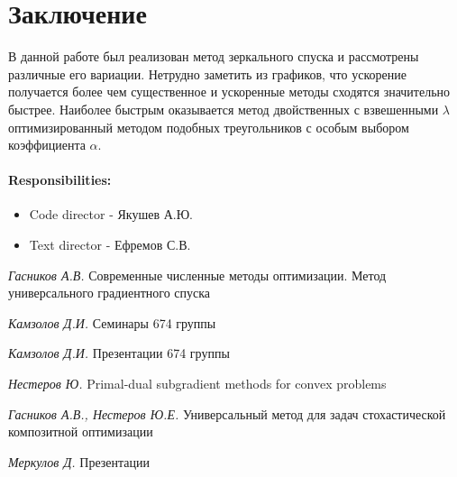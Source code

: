 \documentclass[a4paper,12pt]{article}
\theoremstyle{plain} %
\theoremstyle{definition} %
\theoremstyle{remark} %
\theoremstyle{definition}
\theoremstyle{definition}
\begin{document}
	
	\section{Заключение}
	В данной работе был реализован метод зеркального спуска и рассмотрены различные его вариации. Нетрудно заметить из графиков, что ускорение получается более чем существенное и ускоренные методы сходятся значительно быстрее. Наиболее быстрым оказывается метод двойственных с взвешенными $\lambda$ оптимизированный методом подобных треугольников с особым выбором коэффициента $\alpha$.
	
	\paragraph{Responsibilities:}
	
\begin{itemize}
    \item Code director - Якушев А.Ю.
    \item Text director - Ефремов С.В.
\end{itemize}
	
	\newpage
	
	\begin{thebibliography}{4} 
		 \textit{Гасников А.В.} Современные численные методы оптимизации. Метод универсального градиентного спуска
		
		 \textit{Камзолов Д.И.} Семинары 674 группы 
		
		 \textit{Камзолов Д.И.} Презентации 674 группы
		
		 \textit{Нестеров Ю.} Primal-dual subgradient methods for convex problems
		
		 \textit{Гасников А.В., Нестеров Ю.Е.} Универсальный метод для задач стохастической композитной оптимизации
		
		 \textit{Меркулов Д.} Презентации
		
	\end{thebibliography}
	
	
\end{document}
